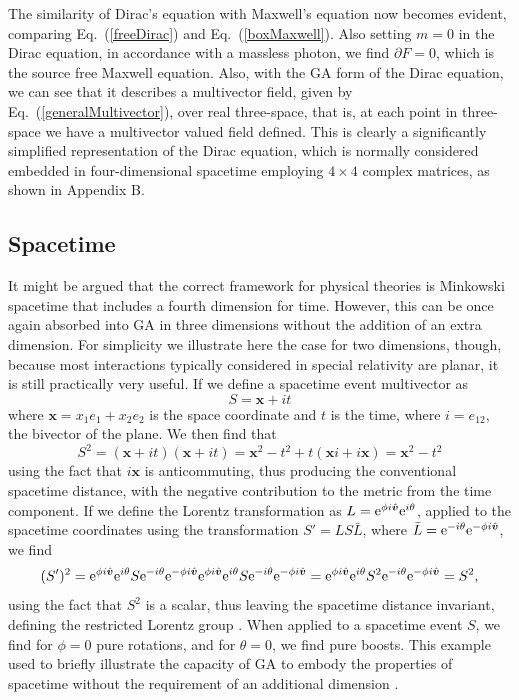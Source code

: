 \documentclass[prb,preprint]{revtex4}
\newcommand{\be}{\begin{equation}}
\newcommand{\ee}{\end{equation}}
\newcommand{\rme}{{\rm{e}}}
\newcommand{\cliffconj}[1] { \bar{#1} }
\begin{document}
The similarity of Dirac's equation with Maxwell's equation now becomes evident, comparing Eq.~(\ref{freeDirac}) and Eq.~(\ref{boxMaxwell}).  Also setting $ m = 0 $ in the Dirac equation, in accordance with a massless photon,  we find $ \partial F = 0 $, which is the source free Maxwell equation.
Also, with the GA form of the Dirac equation, we can see that it describes a multivector field, given by Eq.~(\ref{generalMultivector}), over real three-space, that is, at each point in three-space we have a multivector valued field defined.
This is clearly a significantly simplified representation of the Dirac equation, which is normally considered embedded in four-dimensional spacetime employing  $4 \times 4 $ complex matrices, as shown in Appendix B.

\subsection{Spacetime}

It might be argued that the correct framework for physical theories is Minkowski spacetime that includes a fourth dimension for time.  However, this can be once again absorbed into GA in three dimensions without the addition of an extra dimension.  For simplicity we illustrate here the case for two dimensions, though, because most interactions typically considered in special relativity are planar, it is still practically very useful.  If we define a spacetime event multivector as
\be
S = \boldsymbol{x} + i t
\ee
where $ \boldsymbol{x} = x_1 e_1 + x_2 e_2 $ is the space coordinate and $ t $ is the time, where $ i = e_{12} $, the bivector of the plane.
We then find that 
\be
S^2 = (\boldsymbol{x} + i t)(\boldsymbol{x} + i t) = \boldsymbol{x}^2 -t^2 + t (\boldsymbol{x} i + i \boldsymbol{x} ) = \boldsymbol{x}^2 -t^2 
\ee
using the fact that $ i \boldsymbol{x} $ is anticommuting, thus producing the conventional spacetime distance, with the negative contribution to the metric from the time component.
If we define the Lorentz transformation as $ L = \rme^{\phi i \hat{\boldsymbol{v}} } \rme^{i \theta } $, applied to the spacetime coordinates using the transformation $ S' = L S \cliffconj{L} $, where $ \cliffconj{L} = \rme^{-i \theta } \rme^{-\phi i \hat{\boldsymbol{v}} }  $, we find
\be \label{coordinateBoosts}
(S')^2 = \rme^{\phi i \hat{\boldsymbol{v}} } \rme^{i \theta } S \rme^{-i \theta } \rme^{-\phi i \hat{\boldsymbol{v}} }  \rme^{\phi i \hat{\boldsymbol{v}} } \rme^{i \theta } S \rme^{-i \theta } \rme^{-\phi i \hat{\boldsymbol{v}} }  = \rme^{\phi i \hat{\boldsymbol{v}} } \rme^{i \theta } S^2 \rme^{-i \theta } \rme^{-\phi i \hat{\boldsymbol{v}} } = S^2,
\ee
using the fact that $ S^2 $ is a scalar, thus leaving the spacetime distance invariant, defining the restricted Lorentz group \citep{zeni1992thoughtful}. When applied to a spacetime event $ S $, we find for $ \phi = 0 $ pure rotations, and for $ \theta = 0 $, we find pure boosts.  This example used to briefly illustrate the capacity of GA to embody the properties of spacetime without the requirement of an additional dimension \cite{chappell2011revisiting}.  
\end{document}
